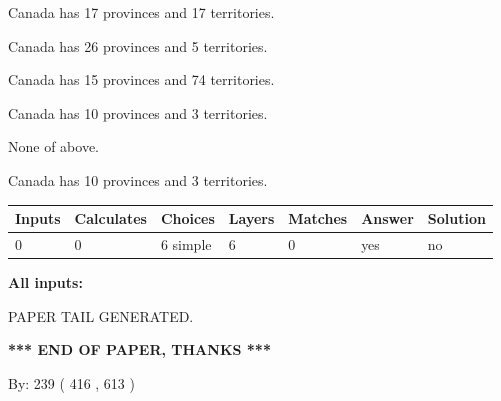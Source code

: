 \documentclass[12pt]{article}
\begin{document}
 
Canada has  17 provinces and  17 territories.
 
 
Canada has  26 provinces and  5 territories.
 
 
Canada has  15 provinces and  74 territories.
 
 
Canada has 10  provinces and 3 territories.
 
 
 None of above.
 
 
\noindent{}
 
 
Canada has 10  provinces and 3 territories.
 
 
\noindent{}
 
 
   
   
   
   
\noindent\begin{tabular}{|l|l|l|l|l|l|l|}
 \hline
Inputs & Calculates & Choices & Layers & Matches & Answer & Solution \\ \hline
 0  & 
 0  & 
 6
  simple  
  & 
 6  & 
 0  & 
  yes & 
  no 
  \\ \hline
 \end{tabular}
   
   
   
   
\noindent{}
   
   
   
   
\noindent\vspace{0.1in}\hspace{-0.08in} {\textbf{\Large{All inputs: }}}
   
   
   
   
   
   
 \vspace{0.2in}
 
   
   
\vspace{2.0in} PAPER TAIL GENERATED.
   
   
   
   
\vspace{1.0in} 
{\textbf{\large{ *** END OF PAPER, THANKS *** }}} 
   
   
\hspace{1.0in} By: 
 239 ( 416 ,  613 )
   
\end{document}
